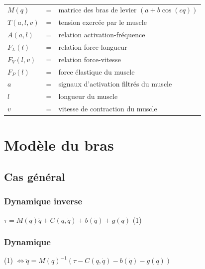 \documentclass[pdftex,a4paper,11pt]{article}
\begin{document}
\paragraph{}
\begin{tabular}{lcl}
    $M(q)$  & = & matrice des bras de levier $(a + b \cos (c q))$ \\
    $T(a, l, v)$ & = & tension exercée par le muscle \\
    $A(a, l)$    & = & relation activation-fréquence \\
    $F_L(l)$     & = & relation force-longueur \\
    $F_V(l, v)$  & = & relation force-vitesse \\
    $F_P(l)$     & = & force élastique du muscle \\ %
    $a$          & = & signaux d'activation filtrés du muscle \\
    $l$          & = & longueur du muscle \\
    $v$          & = & vitesse de contraction du muscle \\
\end{tabular}



\section{Modèle du bras}


\subsection{Cas général}

\subsubsection{Dynamique inverse}
$\tau = M(q)\ddot{q} + C(q, \dot{q}) + b(\dot{q}) + g(q) $ (1)

\subsubsection{Dynamique}
(1) $\Leftrightarrow \ddot{q} = M(q)^{-1} (\tau - C(q, \dot{q}) - b(\dot{q}) - g(q)) $
\end{document}
